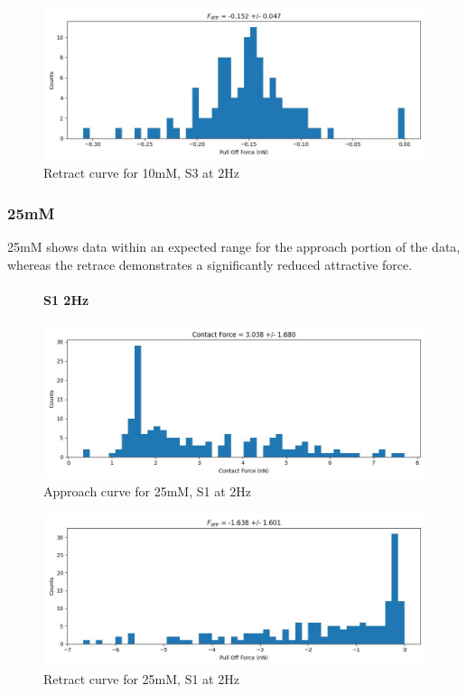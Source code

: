 \begin{figure}[h!]
\centering
\includegraphics[width=\textwidth]{chapter7/Tip speed/10mM/S3 2Hz/retract_f_a_hist.jpg}
\caption{Retract curve for 10mM, S3 at 2Hz}
\end{figure}

\newpage

\subsubsection*{25mM}
25mM shows data within an expected range for the approach portion of the data, whereas the retrace demonstrates a significantly reduced attractive force. 
\begin{figure}[h!]
\paragraph{S1 2Hz}
\centering
\includegraphics[width=\textwidth]{chapter7/Tip speed/25mM/S1 2Hz/approach_f_c_hist.jpg}
\caption{Approach curve for 25mM, S1 at 2Hz}
\end{figure}

\begin{figure}[h!]
\centering
\includegraphics[width=\textwidth]{chapter7/Tip speed/25mM/S1 2Hz/retract_f_a_hist.jpg}
\caption{Retract curve for 25mM, S1 at 2Hz}
\end{figure}

